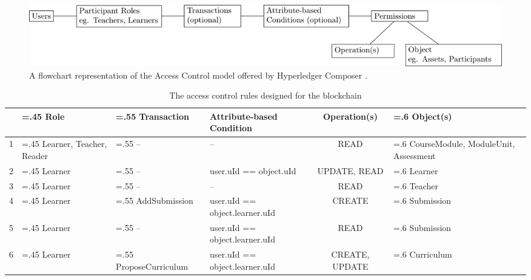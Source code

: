 \begin{figure}[!ht]
	\centering
	\includegraphics[width=1.0\textwidth]{ac_model}
	\caption{A flowchart representation of the Access Control model offered by Hyperledger Composer \citep{official2018composer}.}
	\label{fig:ac_model}
\end{figure}
\begin{landscape}
	\begin{table}[!ht]
		\caption{The access control rules designed for the blockchain}
		\centering
		\label{table:ac_rules}
		\begin{tabularx}{23.5cm}{l>{\hsize=.45\hsize}X>{\hsize=.55\hsize}X>{\hsize=1.25\hsize}Xc>{\hsize=.6\hsize}X}
			   & Role                     & Transaction                          & Attribute-based Condition                                    & Operation(s)   & Object(s)                            \\
			\toprule
			1  & Learner, Teacher, Reader & --                                   & --                                                           & READ           & CourseModule, ModuleUnit, Assessment \\
			\midrule
			2  & Learner                  & --                                   & user.uId == object.uId                                       & UPDATE, READ   & Learner                              \\
			\midrule
			3  & Learner                  & --                                   & --                                                           & READ           & Teacher                              \\
			\midrule
			4  & Learner                  & AddSubmission                        & user.uId == object.learner.uId                               & CREATE         & Submission                           \\
			\midrule
			5  & Learner                  & --                                   & user.uId == object.learner.uId                               & READ           & Submission                           \\
			\midrule
			6  & Learner                  & ProposeCurriculum                    & user.uId == object.learner.uId                               & CREATE, UPDATE & Curriculum                           \\

\end{tabularx}
\end{table}
\end{landscape}
